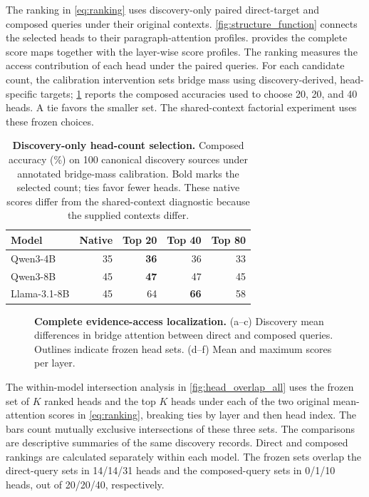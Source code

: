 The ranking in \cref{eq:ranking} uses discovery-only paired direct-target and composed queries under their original contexts. \cref{fig:structure_function} connects the selected heads to their paragraph-attention profiles.  provides the complete score maps together with the layer-wise score profiles. The ranking measures the access contribution of each head under the paired queries. For each candidate count, the calibration intervention sets bridge mass using discovery-derived, head-specific targets; \cref{tab:head_selection} reports the composed accuracies used to choose 20, 20, and 40 heads. A tie favors the smaller set. The shared-context factorial experiment uses these frozen choices.



\begin{table}[!htbp]
  \centering
  \caption{\textbf{Discovery-only head-count selection.} Composed accuracy (\%) on 100 canonical discovery sources under annotated bridge-mass calibration. Bold marks the selected count; ties favor fewer heads. These native scores differ from the shared-context diagnostic because the supplied contexts differ.}
  \label{tab:head_selection}
  \small
  \begin{tabular}{lrrrr}
    \toprule
    \textbf{Model} & \textbf{Native} & \textbf{Top 20} & \textbf{Top 40} & \textbf{Top 80} \\
    \midrule
    Qwen3-4B & 35 & \cellcolor{tableours}\textbf{36} & 36 & 33 \\
    Qwen3-8B & 45 & \cellcolor{tableours}\textbf{47} & 47 & 45 \\
    Llama-3.1-8B & 45 & 64 & \cellcolor{tableours}\textbf{66} & 58 \\
    \bottomrule
  \end{tabular}
\end{table}


\begin{figure}[!htbp]
  \centering
  \begin{minipage}{.94\textwidth}\centering
  \par
  \caption{\textbf{Complete evidence-access localization.} (a--c) Discovery mean differences in bridge attention between direct and composed queries. Outlines indicate frozen head sets. (d--f) Mean and maximum scores per layer.}
  \label{fig:layer_profiles}
\end{minipage}
\end{figure}

The within-model intersection analysis in \cref{fig:head_overlap_all} uses the frozen set of $K$ ranked heads and the top $K$ heads under each of the two original mean-attention scores in \cref{eq:ranking}, breaking ties by layer and then head index. The bars count mutually exclusive intersections of these three sets. The comparisons are descriptive summaries of the same discovery records. Direct and composed rankings are calculated separately within each model. The frozen sets overlap the direct-query sets in 14/14/31 heads and the composed-query sets in 0/1/10 heads, out of 20/20/40, respectively.

